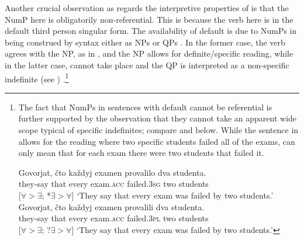 \documentclass[output=paper,modfonts,newtxmath,hidelinks]{langscibook}
\begin{document}
Another crucial observation as regards the interpretive properties of  is that the NumP here is obligatorily non-referential. This is because the verb here is in the default third person singular form. The availability of default  is due to NumPs in  being construed by syntax either as NPs or QPs \citep{Pesetsky1982}. In the former case, the verb agrees with the  NP, as in , and the NP allows for definite/specific reading, while in the latter case,  cannot take place and the QP is interpreted as a non-specific indefinite (see ) \citep{Titov2012}.\footnote{\label{18:fn19}The fact that NumPs in sentences with default  cannot be referential is further supported by the observation that they cannot take an apparent wide scope typical of specific indefinites; compare  and  below. While the sentence in  allows for the reading where two specific students failed all of the exams,  can only mean that for each exam there were two students that failed it.   

\ea \label{18:fn19i}
\gll Govorjat, čto každyj examen provalilo dva studenta. \\
	 they-say  that  every  exam.\textsc{acc}  failed.\textsc{3sg}  two   students \\\hfill [$\forall > \exists$; *$\exists > \forall$]
\glt `They say that every exam was failed by two students.'  
\z
\ea \label{18:fn19ii}
\gll Govorjat, čto každyj examen provalili dva studenta. \\ 
	 they-say  that  every  exam.\textsc{acc}  failed.\textsc{3pl}  two   students  \\\hfill [$\forall > \exists$; ?$\exists > \forall$]
\glt `They say that every exam was failed by two students.'
\z
}  
\ea \label{18:ex23}
	\z
\z           
\end{document}
